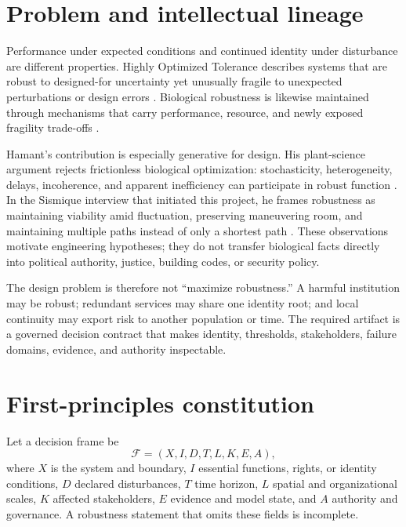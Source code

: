 \documentclass[10pt]{article}
\begin{document}
\section{Problem and intellectual lineage}

Performance under expected conditions and continued identity under disturbance
are different properties. Highly Optimized Tolerance describes systems that
are robust to designed-for uncertainty yet unusually fragile to unexpected
perturbations or design errors \cite{carlson2000,carlson2002}. Biological
robustness is likewise maintained through mechanisms that carry performance,
resource, and newly exposed fragility trade-offs \cite{kitano2004}.

Hamant's contribution is especially generative for design. His plant-science
argument rejects frictionless biological optimization: stochasticity,
heterogeneity, delays, incoherence, and apparent inefficiency can participate
in robust function \cite{hamant2024}. In the Sismique interview that initiated
this project, he frames robustness as maintaining viability amid fluctuation,
preserving maneuvering room, and maintaining multiple paths instead of only a
shortest path \cite{sismique2024}. These observations motivate engineering
hypotheses; they do not transfer biological facts directly into political
authority, justice, building codes, or security policy.

The design problem is therefore not ``maximize robustness.'' A harmful
institution may be robust; redundant services may share one identity root; and
local continuity may export risk to another population or time. The required
artifact is a governed decision contract that makes identity, thresholds,
stakeholders, failure domains, evidence, and authority inspectable.

\section{First-principles constitution}

Let a decision frame be
\begin{equation}
  \mathcal F=(X,I,D,T,L,K,E,A),
  \label{eq:frame}
\end{equation}
where $X$ is the system and boundary, $I$ essential functions, rights, or
identity conditions, $D$ declared disturbances, $T$ time horizon, $L$ spatial
and organizational scales, $K$ affected stakeholders, $E$ evidence and model
state, and $A$ authority and governance. A robustness statement that omits
these fields is incomplete.
\end{document}
